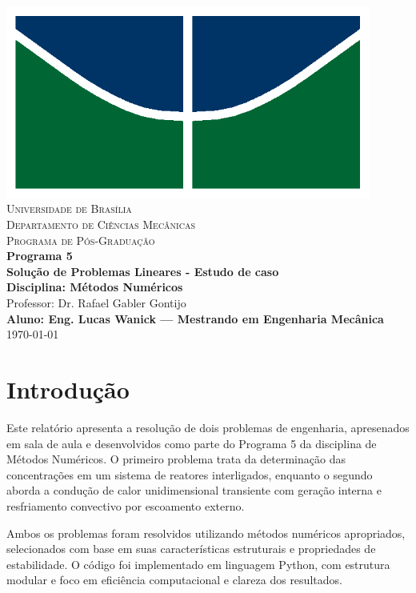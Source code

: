 \documentclass[12pt]{article}
\begin{document}
\begin{titlepage}
    \centering
    \includegraphics[width=12cm]{img/unb_bandeira.png} \\
    \vspace{1cm}
    \textsc{\Large Universidade de Bras\'ilia} \\
    \textsc{Departamento de Ciências Mec\^anicas} \\
    \textsc{Programa de P\'os-Gradua\c{c}\~ao} \\
    \vfill
    {\Large\bfseries Programa 5} \\
    \vspace{0.5cm}
    {\Large\bfseries Solução de Problemas Lineares - Estudo de caso} \\
    \vspace{0.5cm}
    \textbf{Disciplina: M\'etodos Num\'ericos} \\
    Professor: Dr. Rafael Gabler Gontijo \\
    \vfill
    \textbf{Aluno: Eng. Lucas Wanick — Mestrando em Engenharia Mec\^anica} \\
    \vspace{0.5cm}
        \today \\
\end{titlepage}


\section{Introdução}
Este relatório apresenta a resolução de dois problemas de engenharia, apresenados em sala de aula e desenvolvidos como parte do Programa 5 da disciplina de Métodos Numéricos. O primeiro problema trata da determinação das concentrações em um sistema de reatores interligados, enquanto o segundo aborda a condução de calor unidimensional transiente com geração interna e resfriamento convectivo por escoamento externo.

Ambos os problemas foram resolvidos utilizando métodos numéricos apropriados, selecionados com base em suas características estruturais e propriedades de estabilidade. O código foi implementado em linguagem Python, com estrutura modular e foco em eficiência computacional e clareza dos resultados.
\end{document}
